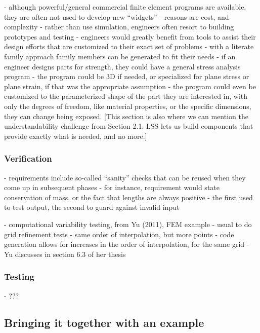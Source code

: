 \documentclass{sig-alternate-05-2015}
\begin{document}
- although powerful/general commercial finite element programs are available, they are often not used to develop new “widgets”
- reasons are cost, and complexity
- rather than use simulation, engineers often resort to building prototypes and testing
- engineers would greatly benefit from tools to assist their design efforts that are customized to their exact set of problems - with a literate family approach family members can be generated to fit their needs
- if an engineer designs parts for strength, they could have a general stress analysis program - the program could be 3D if needed, or specialized for plane stress or plane strain, if that was the appropriate assumption - the program could even be customized to the parameterized shape of the part they are interested in, with only the degrees of freedom, like material properties, or the specific dimensions, they can change being exposed.
[This section is also where we can mention the understandability challenge from Section 2.1.  LSS lets us build components that provide exactly what is needed, and no more.]

\subsubsection{Verification} \label{sssec:adv_verify}

- requirements include so-called “sanity” checks that can be reused when they come up in subsequent phases
- for instance, requirement would state conservation of mass, or the fact that lengths are always positive - the first used to test output, the second to guard against invalid input

- computational variability testing, from Yu (2011), FEM example
- usual to do grid refinement tests - same order of interpolation, but more points
- code generation allows for increases in the order of interpolation, for the same grid
- Yu discusses in section 6.3 of her thesis

\subsubsection{Testing} \label{sssec:adv_test}%

- ???

\subsection{Bringing it together with an example} \label{ssec:example}
\end{document}
